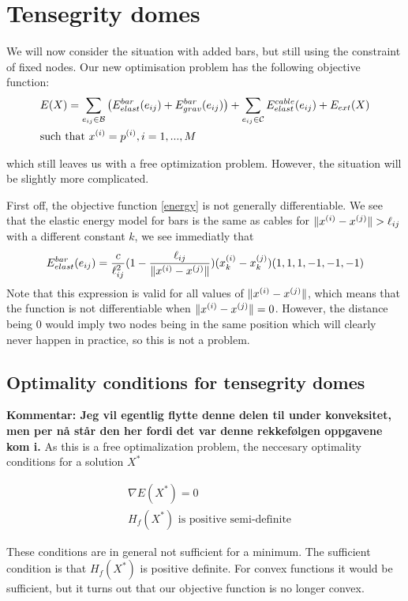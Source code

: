 \section{Tensegrity domes}
We will now consider the situation with added bars, but still using the constraint of fixed nodes. Our new optimisation problem has the following objective function:
\begin{equation}
\begin{aligned}
    \label{energy}
    &E(X) = \sum\limits_{e_{ij} \in \mathcal{B}}\big(E^{bar}_{elast}(e_{ij}) + E^{bar}_{grav}(e_{ij})\big) + \sum\limits_{e_{ij} \in \mathcal{C}} E^{cable}_{elast}(e_{ij}) + E_{ext}(X) \\
    & \text{such that } x^{(i)} = p^{(i)}, i=1,...,M
\end{aligned}
\end{equation}

which still leaves us with a free optimization problem. However, the situation will be slightly more complicated.

First off, the objective function \eqref{energy} is not generally differentiable. We see that the elastic energy model for bars is the same as cables for $\lVert x^{(i)} - x^{(j)}\rVert > \ell_{ij}$ with a different constant $k$, we see immediatly that
\begin{equation*}
E^{bar}_{elast}(e_{ij}) = \frac{c}{\ell_{ij}^2} (1- \frac{\ell_{ij}}{\lVert x^{(i)} - x^{(j)}\rVert}) (x_k^{(i)} - x_k^{(j)}) ( 1, 1, 1,-1,-1,-1)
\end{equation*}
Note that this expression is valid for all values of $\lVert x^{(i)} - x^{(j)}\rVert$, which means that the function is not differentiable when $\lVert x^{(i)} - x^{(j)}\rVert = 0$. However, the distance being $0$ would imply two nodes being in the same position which will clearly never happen in practice, so this is not a problem.

\subsection{Optimality conditions for tensegrity domes}
\textbf{Kommentar: Jeg vil egentlig flytte denne delen til under konveksitet, men per nå står den her fordi det var denne rekkefølgen oppgavene kom i.}
As this is a free optimalization problem, the neccesary optimality conditions for a solution $X^*$ 

\begin{align*}
    &\nabla E(X^*) = 0\\
    & H_f(X^*) \text{ is positive semi-definite}
\end{align*}

These conditions are in general not sufficient for a minimum. The sufficient condition is that $H_f(X^*)$ is positive definite. For convex functions it would be sufficient, but it turns out that our objective function is no longer convex.

